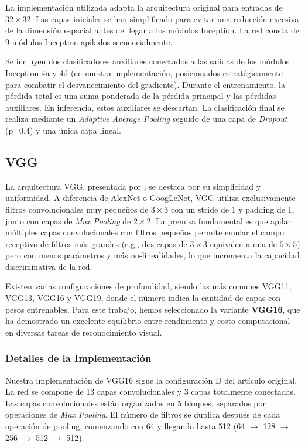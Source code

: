 \documentclass{pas}
\begin{document}
La implementación utilizada adapta la arquitectura original para entradas de $32 \times 32$. Las capas iniciales se han simplificado para evitar una reducción excesiva de la dimensión espacial antes de llegar a los módulos Inception. La red consta de 9 módulos Inception apilados secuencialmente.

Se incluyen dos clasificadores auxiliares conectados a las salidas de los módulos Inception 4a y 4d (en nuestra implementación, posicionados estratégicamente para combatir el desvanecimiento del gradiente). Durante el entrenamiento, la pérdida total es una suma ponderada de la pérdida principal y las pérdidas auxiliares. En inferencia, estos auxiliares se descartan. La clasificación final se realiza mediante un \textit{Adaptive Average Pooling} seguido de una capa de \textit{Dropout} (p=0.4) y una única capa lineal.

\subsection{VGG}

La arquitectura VGG, presentada por \cite{simonyan2014very}, se destaca por su simplicidad y uniformidad. A diferencia de AlexNet o GoogLeNet, VGG utiliza exclusivamente filtros convolucionales muy pequeños de $3 \times 3$ con un stride de 1 y padding de 1, junto con capas de \textit{Max Pooling} de $2 \times 2$. La premisa fundamental es que apilar múltiples capas convolucionales con filtros pequeños permite emular el campo receptivo de filtros más grandes (e.g., dos capas de $3 \times 3$ equivalen a una de $5 \times 5$) pero con menos parámetros y más no-linealidades, lo que incrementa la capacidad discriminativa de la red.

Existen varias configuraciones de profundidad, siendo las más comunes VGG11, VGG13, VGG16 y VGG19, donde el número indica la cantidad de capas con pesos entrenables. Para este trabajo, hemos seleccionado la variante \textbf{VGG16}, que ha demostrado un excelente equilibrio entre rendimiento y costo computacional en diversas tareas de reconocimiento visual.

\subsubsection{Detalles de la Implementación}

Nuestra implementación de VGG16 sigue la configuración D del artículo original. La red se compone de 13 capas convolucionales y 3 capas totalmente conectadas. Las capas convolucionales están organizadas en 5 bloques, separados por operaciones de \textit{Max Pooling}. El número de filtros se duplica después de cada operación de pooling, comenzando con 64 y llegando hasta 512 (64 $\rightarrow$ 128 $\rightarrow$ 256 $\rightarrow$ 512 $\rightarrow$ 512).
\end{document}
